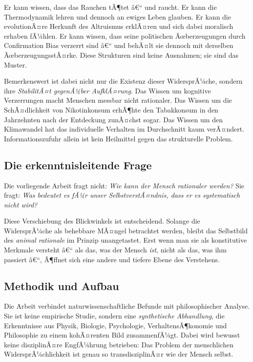 ﻿\documentclass[12pt, a4paper]{article}
\begin{document}
Er kann wissen, dass das Rauchen tÃ¶tet â€“ und raucht. Er kann die Thermodynamik
lehren und dennoch an ewiges Leben glauben. Er kann die evolutionÃ¤re Herkunft des
Altruismus erklÃ¤ren und sich dabei moralisch erhaben fÃ¼hlen. Er kann wissen, dass
seine politischen Ãœberzeugungen durch Confirmation Bias verzerrt sind â€“ und behÃ¤lt
sie dennoch mit derselben ÃœberzeugungsstÃ¤rke. Diese Strukturen sind keine Ausnahmen;
sie sind das Muster.

Bemerkenswert ist dabei nicht nur die Existenz dieser WidersprÃ¼che, sondern ihre
\emph{StabilitÃ¤t gegenÃ¼ber AufklÃ¤rung}. Das Wissen um kognitive Verzerrungen macht
Menschen messbar nicht rationaler. Das Wissen um die SchÃ¤dlichkeit von
Nikotinkonsum erhÃ¶hte den Tabakkonsum in den Jahrzehnten nach der Entdeckung
zunÃ¤chst sogar. Das Wissen um den Klimawandel hat das individuelle Verhalten im
Durchschnitt kaum verÃ¤ndert. Informationszufuhr allein ist kein Heilmittel gegen
das strukturelle Problem.

\subsection{Die erkenntnisleitende Frage}

Die vorliegende Arbeit fragt nicht: \textit{Wie kann der Mensch rationaler werden?}
Sie fragt: \textit{Was bedeutet es fÃ¼r unser SelbstverstÃ¤ndnis, dass er es
systematisch nicht wird?}

Diese Verschiebung des Blickwinkels ist entscheidend. Solange die WidersprÃ¼che
als behebbare MÃ¤ngel betrachtet werden, bleibt das Selbstbild des \textit{animal
rationale} im Prinzip unangetastet. Erst wenn man sie als konstitutive Merkmale
versteht â€“ als das, was der Mensch \emph{ist}, nicht als das, was ihm passiert â€“,
Ã¶ffnet sich eine andere und tiefere Ebene des Verstehens.

\subsection{Methodik und Aufbau}

Die Arbeit verbindet naturwissenschaftliche Befunde mit philosophischer Analyse.
Sie ist keine empirische Studie, sondern eine \emph{synthetische Abhandlung},
die Erkenntnisse aus Physik, Biologie, Psychologie, VerhaltensÃ¶konomie und
Philosophie zu einem kohÃ¤renten Bild zusammenfÃ¼gt. Dabei wird bewusst keine
disziplinÃ¤re EngfÃ¼hrung betrieben: Das Problem der menschlichen WidersprÃ¼chlichkeit
ist genau so transdisziplinÃ¤r wie der Mensch selbst.
\end{document}
